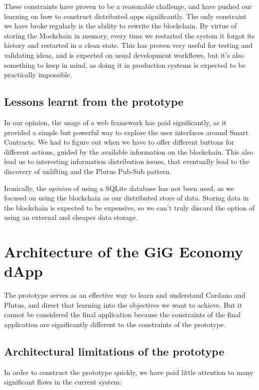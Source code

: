 \documentclass{article}
\begin{document}
These constraints have proven to be a reasonable challenge, and have pushed our learning on how to construct distributed apps significantly. The only constraint we have broke regularly is the ability to rewrite the blockchain. By virtue of storing the Mockchain in memory, every time we restarted the system it forgot its history and restarted in a clean state. This has proven very useful for testing and validating ideas, and is expected on usual development workflows, but it's also something to keep in mind, as doing it in production systems is expected to be practically impossible.

\subsection{Lessons learnt from the prototype}
In our opinion, the usage of a web framework has paid significantly, as it provided a simple but powerful way to explore the user interfaces around Smart Contracts. We had to figure out when we have to offer different buttons for different actions, guided by the available information on the blockchain. This also lead us to interesting information distribution issues, that eventually lead to the discovery of unlifting and the Plutus Pub-Sub pattern\cite{pub-sub-paper}.

Ironically, the \emph{opinion} of using a SQLite database has not been used, as we focused on using the blockchain as our distributed store of data. Storing data in the blockchain is expected to be expensive\cite{transaction-fees}, so we can't truly discard the option of using an external and cheaper data storage.


\section{Architecture of the GiG Economy dApp}
The prototype serves as an effective way to learn and understand Cardano and Plutus, and direct that learning into the objectives we want to achieve. But it cannot be considered the final application because the constraints of the final application are significantly different to the constraints of the prototype.

\subsection{Architectural limitations of the prototype}

In order to construct the prototype quickly, we have paid little attention to many significant flaws in the current system:
\end{document}
